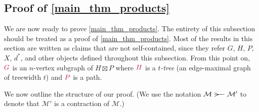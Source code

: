 \documentclass{patmorin}
\makeatletter
\renewcommand{\ge}{\geqslant}
\newcommand{\defin}[1]{\emph{\textcolor{brightmaroon}{#1}}}
\def\mathcolor#1#{\@mathcolor{#1}}
\def\@mathcolor#1#2#3{%
  \protect\leavevmode
  \begingroup
    \color#1{#2}#3%
  \endgroup
}
\newcommand{\mathdefin}[1]{\mathcolor{brightmaroon}{#1}}
\DeclareMathOperator{\diam}{diam}
\makeatother
\begin{document}
%
%
%

\subsection{Proof of \texorpdfstring{\cref{main_thm_products}}{Theorem?}}

We are now ready to prove \cref{main_thm_products}. The entirety of this subsection should be treated as a proof of \cref{main_thm_products}. Most of the results in this section are written as claims that are not self-contained, since they refer $G$, $H$, $P$, $X$, $d^*$, and other objects defined throughout this subsection. From this point on, $\mathdefin{G}$ is an $n$-vertex subgraph of $H\boxtimes P$ where $\mathdefin{H}$ is a \defin{$t$-tree} (an edge-maximal graph of treewidth $t$) and $\mathdefin{P}$ is a path.

We now outline the structure of our proof.
(We use the notation $\mathcal{M}\rightbroom\mathcal{M'}$ to denote that $\mathcal{M}'$ is a contraction of $\mathcal{M}$.)
\end{document}
